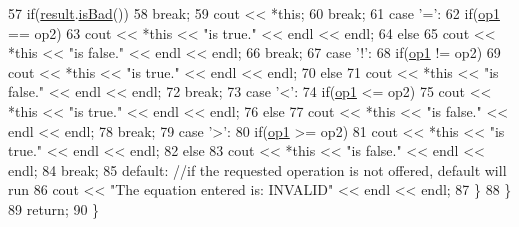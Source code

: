 \begin{DoxyCode}
57             \textcolor{keywordflow}{if}(\hyperlink{classEquation_a7696f7ad262ed21259b3fd3d2d628549}{result}.\hyperlink{classHugeInteger_a49c11f16dad4dbb56d277ddb0eb71342}{isBad}())
58                \textcolor{keywordflow}{break};
59             cout << *\textcolor{keyword}{this};
60             \textcolor{keywordflow}{break};
61          \textcolor{keywordflow}{case} \textcolor{charliteral}{'='}:
62             \textcolor{keywordflow}{if}(\hyperlink{classEquation_af03ee24dda87646ad14a87363fe6a459}{op1} == op2)
63                cout << *\textcolor{keyword}{this} << \textcolor{stringliteral}{"is true."} << endl << endl;
64             \textcolor{keywordflow}{else}
65                cout << *\textcolor{keyword}{this} << \textcolor{stringliteral}{"is false."} << endl << endl;
66             \textcolor{keywordflow}{break};
67          \textcolor{keywordflow}{case} \textcolor{charliteral}{'!'}:
68             \textcolor{keywordflow}{if}(\hyperlink{classEquation_af03ee24dda87646ad14a87363fe6a459}{op1} != op2)
69                cout << *\textcolor{keyword}{this} << \textcolor{stringliteral}{"is true."} << endl << endl;
70             \textcolor{keywordflow}{else}
71                cout << *\textcolor{keyword}{this} << \textcolor{stringliteral}{"is false."} << endl << endl;
72             \textcolor{keywordflow}{break};
73          \textcolor{keywordflow}{case} \textcolor{charliteral}{'<'}:
74             \textcolor{keywordflow}{if}(\hyperlink{classEquation_af03ee24dda87646ad14a87363fe6a459}{op1} <= op2)
75                cout << *\textcolor{keyword}{this} << \textcolor{stringliteral}{"is true."} << endl << endl;
76             \textcolor{keywordflow}{else}
77                cout << *\textcolor{keyword}{this} << \textcolor{stringliteral}{"is false."} << endl << endl;
78             \textcolor{keywordflow}{break};
79          \textcolor{keywordflow}{case} \textcolor{charliteral}{'>'}:
80             \textcolor{keywordflow}{if}(\hyperlink{classEquation_af03ee24dda87646ad14a87363fe6a459}{op1} >= op2)
81                cout << *\textcolor{keyword}{this} << \textcolor{stringliteral}{"is true."} << endl << endl;
82             \textcolor{keywordflow}{else}
83                cout << *\textcolor{keyword}{this} << \textcolor{stringliteral}{"is false."} << endl << endl;
84             \textcolor{keywordflow}{break};
85          \textcolor{keywordflow}{default}: \textcolor{comment}{//if the requested operation is not offered, default will run                            
                                                                                                       }
86             cout << \textcolor{stringliteral}{"The equation entered is: INVALID"} << endl << endl;
87       \}
88    \}
89    \textcolor{keywordflow}{return};
90 \}
\end{DoxyCode}

